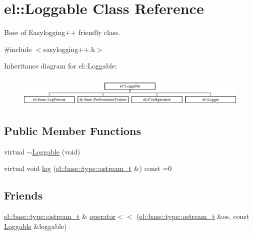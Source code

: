 \hypertarget{classel_1_1_loggable}{}\section{el\+:\+:Loggable Class Reference}
\label{classel_1_1_loggable}


Base of Easylogging++ friendly class.  




{\ttfamily \#include $<$easylogging++.\+h$>$}

Inheritance diagram for el\+:\+:Loggable\+:\begin{figure}[H]
\begin{center}
\leavevmode
\includegraphics[height=1.505376cm]{classel_1_1_loggable}
\end{center}
\end{figure}
\subsection*{Public Member Functions}
\begin{DoxyCompactItemize}
\item 
virtual \hyperlink{classel_1_1_loggable_a6891b802d139da4041edf9e36d38e6c4}{$\sim$\+Loggable} (void)
\item 
virtual void \hyperlink{classel_1_1_loggable_ad8a2e0ebc11e4bd00ef49fc67db3d59e}{log} (\hyperlink{namespaceel_1_1base_1_1type_a74ea109bf34d1c44926837fb0830f445}{el\+::base\+::type\+::ostream\+\_\+t} \&) const =0
\end{DoxyCompactItemize}
\subsection*{Friends}
\begin{DoxyCompactItemize}
\item 
\hyperlink{namespaceel_1_1base_1_1type_a74ea109bf34d1c44926837fb0830f445}{el\+::base\+::type\+::ostream\+\_\+t} \& \hyperlink{classel_1_1_loggable_a00722a386f498be3ebece2e266fb0f05}{operator$<$$<$} (\hyperlink{namespaceel_1_1base_1_1type_a74ea109bf34d1c44926837fb0830f445}{el\+::base\+::type\+::ostream\+\_\+t} \&os, const \hyperlink{classel_1_1_loggable}{Loggable} \&loggable)
\end{DoxyCompactItemize}


